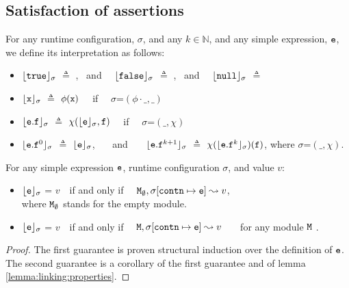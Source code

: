 \subsection{Satisfaction of assertions}



\begin{definition}

For any runtime configuration, $\sigma$, and any $k\in \mathbb{N}$, and any simple expression, ${\mbox{\tt{e}}}$, we define its interpretation as follows:

\begin{itemize}
     \item
  ${\lfloor{ {{\mbox{\tt{true}}}}}\rfloor_{\sigma}}$ $ \triangleq$   , \ and \ \    ${\lfloor{ {{\mbox{\tt{false}}}}}\rfloor_{\sigma}}$ $ \triangleq$ , \ and \ \
   $\interp {}{\sigma}$ $ \triangleq$  \prg{null}
  \item
  ${\lfloor{ {{\mbox{\tt{x}}}}}\rfloor_{\sigma}}$ $ \triangleq$ $\phi({\mbox{\tt{x}}})$  \ \ if \ \ $\sigma$=$(\phi\cdot\_,\_)$
  \item
  ${\lfloor{ {\ensuremath{{\mbox{\tt{e}}}}.{\mbox{\tt{f}}}}}\rfloor_{\sigma}}$ $ \triangleq$ $\chi({{\lfloor{ {\ensuremath{{\mbox{\tt{e}}}}}}\rfloor_{\sigma}}}, {\mbox{\tt{f}}})$  \ \ if \ \ $\sigma$=$(\_,\chi)$
   \item
     ${\lfloor{ {\ensuremath{{\mbox{\tt{e}}}}.{\mbox{\tt{f}}}^0}}\rfloor_{\sigma}}$ $ \triangleq$  ${\lfloor{ {\ensuremath{{\mbox{\tt{e}}}}}}\rfloor_{\sigma}}$, \ \ \ and \ \ \ ${\lfloor{ {\ensuremath{{\mbox{\tt{e}}}}.{\mbox{\tt{f}}}^{k+1}}}\rfloor_{\sigma}}$ $ \triangleq$   $\chi({{\lfloor{ {\ensuremath{{\mbox{\tt{e}}}}.{\mbox{\tt{f}}}^k}}\rfloor_{\sigma}}})({\mbox{\tt{f}}})$, where $\sigma$=$(\_,\chi)$.
   \end{itemize}
\end{definition}

\begin{lemma}
For any simple expression ${\mbox{\tt{e}}}$, runtime configuration $\sigma$, and value $v$:

\begin{itemize}
     \item
  ${\lfloor{ {\ensuremath{{\mbox{\tt{e}}}}}}\rfloor_{\sigma}}$ = $v$\ \     if and only if \ \ ${\mbox{\tt{\ensuremath{{\mbox{\tt{M}}}}}}}_\emptyset, \sigma[{\mbox{\tt{contn}}}\mapsto {\mbox{\tt{e}}}] \leadsto v$,\\
  where ${\mbox{\tt{\ensuremath{{\mbox{\tt{M}}}}}}}_\emptyset$ stands for the empty module.
  \item
   ${\lfloor{ {\ensuremath{{\mbox{\tt{e}}}}}}\rfloor_{\sigma}}$ = $v$\ \     if and only if \ \ ${\mbox{\tt{\ensuremath{{\mbox{\tt{M}}}}}}}, \sigma[{\mbox{\tt{contn}}}\mapsto {\mbox{\tt{e}}}] \leadsto v$ \ \ \ for any module ${\mbox{\tt{\ensuremath{{\mbox{\tt{M}}}}}}}$ .
   \end{itemize}
   \end{lemma}

   \begin{proof} The  first guarantee is proven structural induction  over the definition of ${\mbox{\tt{e}}}$.
   The second guarantee  is a corollary of the first guarantee  and of lemma \ref{lemma:linking:properties}.\end{proof}


